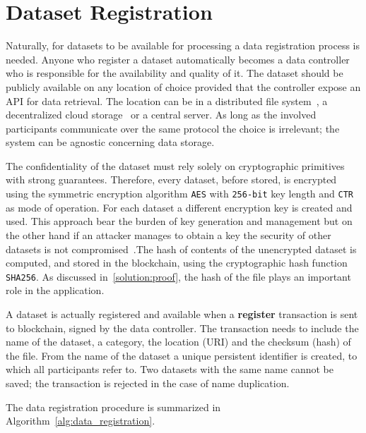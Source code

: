 \section{Dataset Registration}
\label{solution:flow:reg_data}

Naturally, for datasets to be available for processing a data registration process is needed. Anyone who register a dataset automatically becomes a data controller who is responsible for the availability and quality of it. The dataset should be publicly available on any location of choice provided that the controller expose an API for data retrieval. The location can be in a distributed file system~\cite{ipfs}, a decentralized cloud storage~\cite{storj} or a central server. As long as the involved participants communicate over the same protocol the choice is irrelevant; the system can be agnostic concerning data storage.

The confidentiality of the dataset must rely solely on cryptographic primitives with strong guarantees. Therefore, every dataset, before stored, is encrypted using the symmetric encryption algorithm \verb|AES| with \verb|256-bit| key length and \verb|CTR| as mode of operation. For each dataset a different encryption key is created and used. This approach bear the burden of key generation and management but on the other hand if an attacker manages to obtain a key the security of other datasets is not compromised~\cite{schneier1997improved}.The hash of contents of the unencrypted dataset is computed, and stored in the blockchain, using the cryptographic hash function \verb|SHA256|. As discussed in~\ref{solution:proof}, the hash of the file plays an important role in the application.

A dataset is actually registered and available when a \textbf{register} transaction is sent to blockchain, signed by the data controller. The transaction needs to include the name of the dataset, a category, the location (URI) and the checksum (hash) of the file. From the name of the dataset a unique persistent identifier is created, to which all participants refer to. Two datasets with the same name cannot be saved; the transaction is rejected in the case of name duplication.

The data registration procedure is summarized in Algorithm~\ref{alg:data_registration}.

